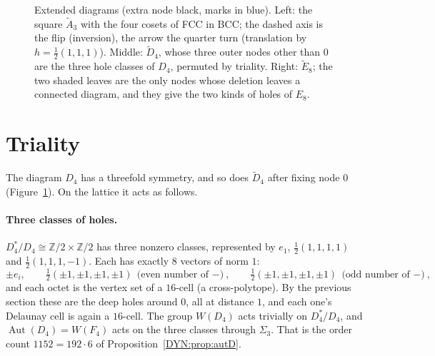 \documentclass[11pt,openany]{book}
\theoremstyle{plain}
\theoremstyle{definition}
\theoremstyle{remark}
\newcommand{\Z}{\mathbb{Z}}
\begin{document}
\begin{figure}[ht]
\caption{Extended diagrams (extra node black, marks in blue). Left: the square $\tilde A_3$ with the four
cosets of FCC in BCC; the dashed axis is the flip (inversion), the arrow the quarter turn (translation by
$h=\frac12(1,1,1)$). Middle: $\tilde D_4$, whose three outer nodes other than $0$ are the three hole
classes of $D_4$, permuted by triality. Right: $\tilde E_8$; the two shaded leaves are the only nodes whose
deletion leaves a connected diagram, and they give the two kinds of holes of $E_8$.}
\label{DYN:fig:ext}
\end{figure}

\section{Triality}
\label{DYN:sec:triality}

The diagram $D_4$ has a threefold symmetry, and so does $\tilde D_4$ after fixing node $0$
(Figure~\ref{DYN:fig:ext}). On the lattice it acts as follows.

\paragraph{Three classes of holes.} $D_4^*/D_4\cong\Z/2\times\Z/2$ has three nonzero classes, represented
by $e_1$, $\frac12(1,1,1,1)$ and $\frac12(1,1,1,-1)$. Each has exactly $8$ vectors of norm $1$:
\[
  \pm e_i,\qquad \tfrac12(\pm1,\pm1,\pm1,\pm1)\ \text{(even number of $-$)},\qquad
  \tfrac12(\pm1,\pm1,\pm1,\pm1)\ \text{(odd number of $-$)},
\]
and each octet is the vertex set of a $16$-cell (a cross-polytope). By the previous section these are
the deep holes around $0$, all at distance $1$, and each one's Delaunay cell is again a $16$-cell. The
group $W(D_4)$ acts trivially on $D_4^*/D_4$, and $\operatorname{Aut}(D_4)=W(F_4)$ acts on the three classes through
$\Sigma_3$. That is the order count $1152=192\cdot6$ of Proposition~\ref{DYN:prop:autD}.
\end{document}
